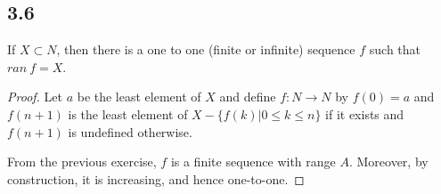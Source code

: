 \subsection*{3.6} If $X \subset N$, then there is a one to one (finite or infinite) sequence $f$ such that $ran~f = X$.

\begin{proof}
Let $a$ be the least element of $X$ and define $f: N \rightarrow N$ by $f(0) = a$ and $f(n+1)$ is the least element of $X - \{f(k) | 0 \leq k \leq n\}$ if it exists and $f(n+1)$ is undefined otherwise. 

From the previous exercise, $f$ is a finite sequence with range $A$. Moreover, by construction, it is increasing, and hence one-to-one.
\end{proof}

\newpage

